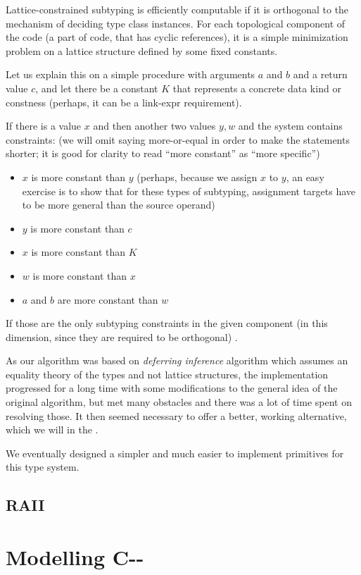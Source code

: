 Lattice-constrained subtyping is efficiently computable if it is orthogonal to the mechanism of deciding type class instances. For each topological component of the code (a part of code, that has cyclic references), it is a simple minimization problem on a lattice structure defined by some fixed constants.

Let us explain this on a simple procedure with arguments $a$ and $b$ and a return value $c$, and let there be a constant $K$ that represents a concrete data kind or constness (perhaps, it can be a link-expr requirement).

If there is a value $x$ and then another two values $y, w$ and the system contains constraints: (we will omit saying more-or-equal in order to make the statements shorter; it is good for clarity to read ``more constant'' as ``more specific'')

\begin{itemize}
    \label{subtyping-idea}
    \item $x$ is more constant than $y$ (perhaps, because we assign $x$ to $y$, an easy exercise is to show that for these types of subtyping, assignment targets have to be more general than the source operand)
    \item $y$ is more constant than $c$
    \item $x$ is more constant than $K$
    \item $w$ is more constant than $x$
    \item $a$ and $b$ are more constant than $w$
\end {itemize}

If those are the only subtyping constraints in the given component (in this dimension, since they are required to be orthogonal) .

As our algorithm was based on \textit{deferring inference} algorithm which assumes an equality theory of the types and not lattice structures, the implementation progressed for a long time with some modifications to the general idea of the original algorithm, but met many obstacles and there was a lot of time spent on resolving those. It then seemed necessary to offer a better, working alternative, which we will in the .

We eventually designed a simpler and much easier to implement primitives for this type system. 


\subsection{RAII}

\label{RAII}




\section{Modelling C-{}-}

